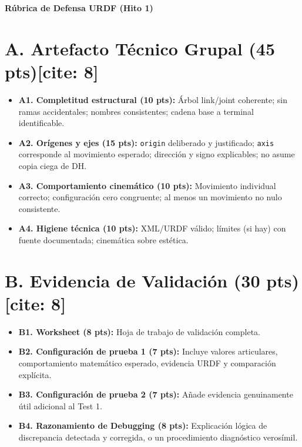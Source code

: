 \documentclass[11pt, a4paper]{article}
\begin{document}
\begin{center}
    \Large\textbf{\textcolor{ucbblue}{Rúbrica de Defensa URDF (Hito 1)}}\\[0.2cm]
\end{center}

\section*{A. Artefacto Técnico Grupal (45 pts)[cite: 8]}
\begin{itemize}
    \item \textbf{A1. Completitud estructural (10 pts):} Árbol link/joint coherente; sin ramas accidentales; nombres consistentes; cadena base a terminal identificable.
    \item \textbf{A2. Orígenes y ejes (15 pts):} \texttt{origin} deliberado y justificado; \texttt{axis} corresponde al movimiento esperado; dirección y signo explicables; no asume copia ciega de DH.
    \item \textbf{A3. Comportamiento cinemático (10 pts):} Movimiento individual correcto; configuración cero congruente; al menos un movimiento no nulo consistente.
    \item \textbf{A4. Higiene técnica (10 pts):} XML/URDF válido; límites (si hay) con fuente documentada; cinemática sobre estética.
\end{itemize}

\section*{B. Evidencia de Validación (30 pts)[cite: 8]}
\begin{itemize}
    \item \textbf{B1. Worksheet (8 pts):} Hoja de trabajo de validación completa.
    \item \textbf{B2. Configuración de prueba 1 (7 pts):} Incluye valores articulares, comportamiento matemático esperado, evidencia URDF y comparación explícita.
    \item \textbf{B3. Configuración de prueba 2 (7 pts):} Añade evidencia genuinamente útil adicional al Test 1.
    \item \textbf{B4. Razonamiento de Debugging (8 pts):} Explicación lógica de discrepancia detectada y corregida, o un procedimiento diagnóstico verosímil.
\end{itemize}
\end{document}
